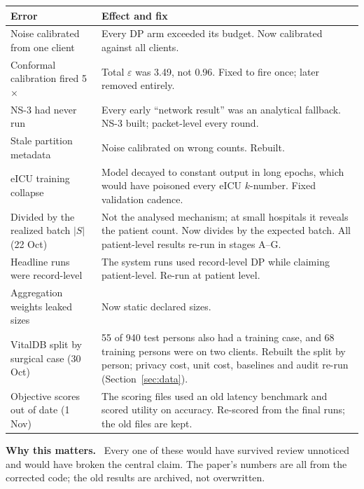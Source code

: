 \documentclass[11pt,a4paper]{article}
\newenvironment{warnbox}[1]{\par\textbf{#1.}\ }{\par}
\begin{document}
\begin{center}
\small
\begin{tabular}{P{0.32\textwidth} P{0.6\textwidth}}
\toprule
Error & Effect and fix \\
\midrule
Noise calibrated from one client & Every DP arm exceeded its budget.
Now calibrated against all clients. \\
Conformal calibration fired 5$\times$ & Total $\varepsilon$ was 3.49, not 0.96.
Fixed to fire once; later removed entirely. \\
NS-3 had never run & Every early ``network result'' was an analytical
fallback. NS-3 built; packet-level every round. \\
Stale partition metadata & Noise calibrated on wrong counts. Rebuilt. \\
eICU training collapse & Model decayed to constant output in long epochs,
which would have poisoned every eICU $k$-number. Fixed validation cadence. \\
Divided by the realized batch $|S|$ (22 Oct) & Not the analysed mechanism;
at small hospitals it reveals the patient count. Now divides by the expected
batch. All patient-level results re-run in stages A--G. \\
Headline runs were record-level & The system runs used record-level DP
while claiming patient-level. Re-run at patient level. \\
Aggregation weights leaked sizes & Now static declared sizes. \\
VitalDB split by surgical case (30 Oct) & 55 of 940 test persons also had a
training case, and 68 training persons were on two clients. Rebuilt the split by
person; privacy cost, unit cost, baselines and audit re-run (Section~\ref{sec:data}). \\
Objective scores out of date (1 Nov) & The scoring files used an old latency
benchmark and scored utility on accuracy. Re-scored from the final runs; the old
files are kept. \\
\bottomrule
\end{tabular}
\end{center}

\begin{warnbox}{Why this matters}
Every one of these would have survived review unnoticed and would have broken
the central claim. The paper's numbers are all from the corrected code; the old
results are archived, not overwritten.
\end{warnbox}

\end{document}
